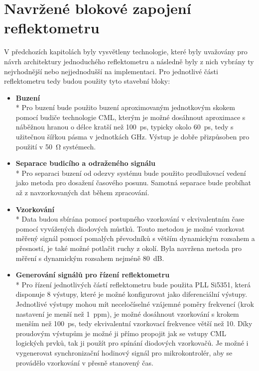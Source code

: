 \chapter{Navržené blokové zapojení reflektometru}
V předchozích kapitolách byly vysvětleny technologie, které byly uvažovány pro návrh architektury jednoduchého reflektometru a následně byly z nich vybrány ty nejvhodnější nebo nejjednodušší na implementaci. Pro jednotlivé části reflektometru tedy budou použity tyto stavební bloky:
\begin{itemize}
	\item
	\textbf{Buzení}\\*
	Pro buzení bude použito buzení aproximovaným jednotkovým skokem pomocí budiče technologie \acrshort{CML}, kterým je možné dosáhnout aproximace s náběžnou hranou o délce kratší než \SI{100}{\pico\second}, typicky okolo \SI{60}{\pico\second}, tedy s užitečnou šířkou pásma v jednotkách \si{\giga\hertz}. Výstup je dobře přizpůsoben pro použití v \SI{50}{\ohm} systémech.
	
	\item
	\textbf{Separace budicího a odraženého signálu}\\*	
	Pro separaci buzení od odezvy systému bude použito prodlužovací vedení jako metoda pro dosažení časového posunu. Samotná separace bude probíhat až z navzorkovaných dat během zpracování.
	
	\item
	\textbf{Vzorkování}\\*	
	Data budou sbírána pomocí postupného vzorkování v ekvivalentním čase pomocí vyvážených diodových můstků. Touto metodou je možné vzorkovat měřený signál pomocí pomalých převodníků s větším dynamickým rozsahem a přesností, je také možné potlačit ruchy z okolí. Byla navržena metoda pro měření s dynamickým rozsahem nejméně \SI{80}{\deci\bel}.
	
	\item
	\textbf{Generování signálů pro řízení reflektometru}\\*	
	Pro řízení jednotlivých částí reflektometru bude použita \acrshort{PLL} Si5351, která disponuje 8 výstupy, které je možné konfigurovat jako diferenciální výstupy. Jednotlivé výstupy mohou mít neceločíselné vzájemné poměry frekvencí (krok nastavení je menší než \SI{1}{ppm}), je možné dosáhnout vzorkování s krokem menším než \SI{100}{\pico\second}, tedy ekvivalentní vzorkovací frekvence větší než \SI{10}{\gigasample}. Díky proudovým výstupům je možné ji přímo propojit jak se vstupy \acrshort{CML} logických prvků, tak ji použít pro spínání diodových vzorkovačů. Je možné i vygenerovat synchronizační hodinový signál pro mikrokontrolér, aby se provádělo vzorkování v přesně stanovený čas.
\end{itemize}

